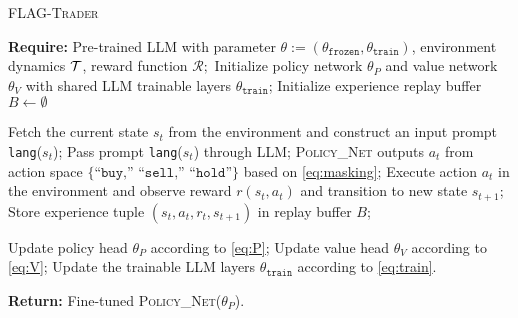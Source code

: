 \begin{algorithm}[ht]
\caption{\textsc{FLAG-Trader}}
\begin{algorithmic}[1]
\STATE \textbf{Require:} Pre-trained LLM with parameter  $\theta:=(\theta_{\texttt{frozen}}, \theta_{\texttt{train}})$, environment dynamics $\mathcal{T}$, reward function $\mathcal{R};$
\STATE Initialize policy network $\theta_P$ and value network $\theta_V$ with shared LLM trainable layers $\theta_{\texttt{train}}$;
\STATE Initialize experience replay buffer $B \leftarrow \emptyset$

    \STATE Fetch the current state $s_t$ from the environment and construct an input prompt \texttt{lang}($s_t$);
    \STATE Pass prompt \texttt{lang}($s_t$) through LLM;
    \STATE \textsc{Policy\_Net} outputs $a_t$ from action space $\{\texttt{``buy,'' ``sell,'' ``hold''}\}$ based on \eqref{eq:masking};
    \STATE Execute action $a_t$ in the environment and observe reward $r(s_t, a_t)$ and transition to new state $s_{t+1}$;
    \STATE Store experience tuple $(s_t, a_t, r_t, s_{t+1})$ in replay buffer $B$;
    
        \STATE Update policy head $\theta_P$ according to \eqref{eq:P};
        \STATE Update value head $\theta_V$ according to \eqref{eq:V};
        \STATE Update the trainable LLM layers $\theta_{\texttt{train}}$ according to \eqref{eq:train}.
        
    \ENDIF
\ENDFOR

\STATE \textbf{Return:} Fine-tuned \textsc{Policy\_Net}($\theta_P$).
\end{algorithmic}
\label{alg:1}
\end{algorithm}


